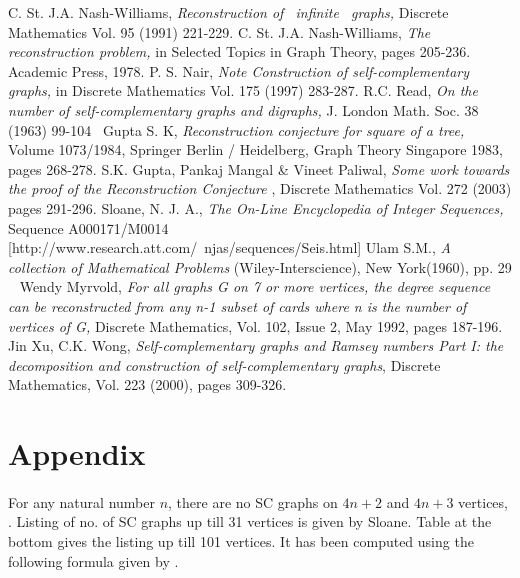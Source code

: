 \documentclass[12pt,conference]{IEEEtran}
\begin{document}
\begin{thebibliography}{}
C. St. J.A. Nash-Williams, \emph{Reconstruction  of  infinite  graphs,} Discrete Mathematics Vol. 95 (1991) 221-229. 
C. St. J.A. Nash-Williams, \emph{The reconstruction problem,} in Selected Topics in Graph Theory, pages 205-236. Academic Press, 1978. 
P. S. Nair, \emph{Note Construction of self-complementary graphs,} in Discrete Mathematics Vol. 175 (1997) 283-287.
R.C. Read, \emph{On the number of self-complementary graphs and digraphs,} J. London Math. Soc. 38 (1963) 99-104 
Gupta S. K, \emph{Reconstruction conjecture for square of a tree,} Volume 1073/1984, Springer Berlin / Heidelberg, Graph Theory Singapore 1983, pages 268-278. 
S.K. Gupta, Pankaj Mangal \& Vineet Paliwal, \emph{Some work towards the proof of the Reconstruction Conjecture }, Discrete Mathematics Vol. 272 (2003) pages 291-296.
Sloane, N. J. A., \emph{The On-Line Encyclopedia of Integer Sequences,} Sequence A000171/M0014 [http://www.research.att.com/~njas/sequences/Seis.html] 
Ulam S.M., \emph{A collection of Mathematical Problems} (Wiley-Interscience), New York(1960), pp. 29   
Wendy Myrvold, \emph{For all graphs G on 7 or more vertices, the degree sequence can be reconstructed from any n-1 subset of cards where n is the number of vertices of G,} Discrete Mathematics, Vol. 102, Issue 2, May 1992, pages 187-196.
Jin Xu, C.K. Wong, \emph{Self-complementary graphs and Ramsey numbers Part I: the decomposition and construction of self-complementary graphs}, Discrete Mathematics, Vol. 223 (2000), pages 309-326.
\\
\end{thebibliography}

\newpage
\section* {Appendix} 
\paragraph*{} For any natural number $n$, there are no SC graphs on $4n+2$ and $4n+3$ vertices, \cite{r1}. Listing of no. of SC graphs up till 31 vertices is given by Sloane\cite{s3}.
 Table at the bottom gives the listing up till 101 vertices. It has been computed using the following formula given by \cite{r1}. \\
\end{document}
